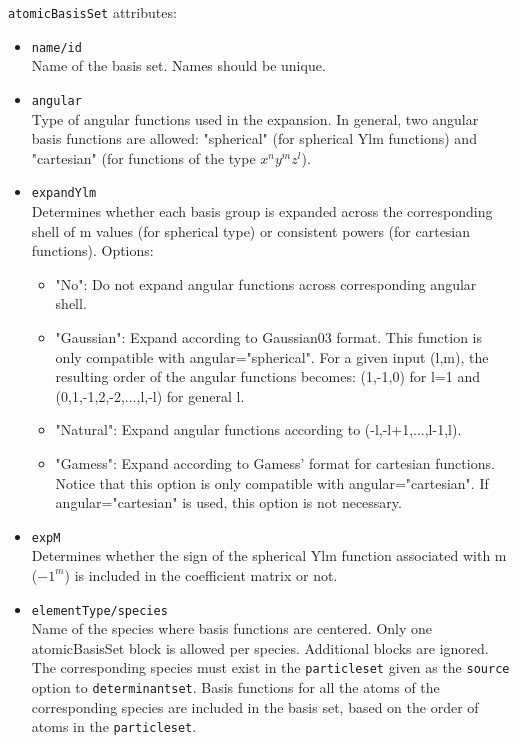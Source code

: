\texttt{atomicBasisSet} attributes:

\begin{itemize}
\item \texttt{name/id}\\
Name of the basis set. Names should be unique.
\item \texttt{angular}\\
Type of angular functions used in the expansion. In general, two angular basis functions are allowed: "spherical" (for spherical Ylm functions) and "cartesian" (for functions of the type $x^{n}y^{m}z^{l}$).  
\item \texttt{expandYlm}\\
Determines whether each basis group is expanded across the corresponding shell of m values (for spherical type) or consistent powers (for cartesian functions). Options:
\begin{itemize}
\item "No": Do not expand angular functions across corresponding angular shell.
\item "Gaussian": Expand according to Gaussian03 format. This function is only compatible with angular="spherical". For a given input (l,m), the resulting order of the angular functions becomes: (1,-1,0) for l=1 and (0,1,-1,2,-2,...,l,-l) for general l.
\item "Natural": Expand angular functions according to (-l,-l+1,...,l-1,l). 
\item "Gamess": Expand according to Gamess' format for cartesian functions. Notice that this option is only compatible with angular="cartesian". If angular="cartesian" is used, this option is not necessary.
\end{itemize}
\item \texttt{expM}\\ 
Determines whether the sign of the spherical Ylm function associated with m ($-1^{m}$) is included in the coefficient matrix or not.
\item \texttt{elementType/species}\\
Name of the species where basis functions are centered. Only one atomicBasisSet block is allowed per species. Additional blocks are ignored. The corresponding species must exist in the \texttt{particleset} given as the \texttt{source} option to \texttt{determinantset}. Basis functions for all the atoms of the corresponding species are included in the basis set, based on the order of atoms in the \texttt{particleset}.
\end{itemize}

